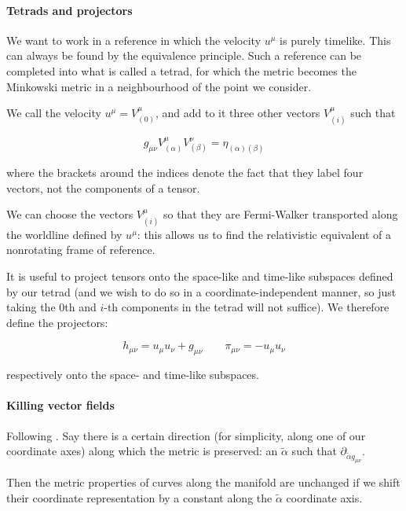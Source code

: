 \documentclass[main.tex]{subfiles}
\begin{document}
\paragraph{Tetrads and projectors} \label{par:tetrads}

We want to work in a reference in which the velocity $u^\mu$ is purely timelike. This can always be found by the equivalence principle. Such a reference can be completed into what  is called a tetrad, for which the metric becomes the Minkowski metric in a neighbourhood of the point we consider.

We call the velocity \(u^\mu = V^\mu _{(0)}\), and add to it three other vectors \(V^\mu_{(i)}\) such that

\begin{equation}
    g_{\mu\nu} V^\mu _{(\alpha)} V^\nu _{(\beta)} = \eta_{(\alpha) (\beta)}
\end{equation}

where the brackets around the indices denote the fact that they label four vectors, not the components of a tensor.

We can choose the vectors \(V_{(i)}^\mu\) so that they are Fermi-Walker transported along the worldline defined by \(u^\mu\): this allows us to find the relativistic equivalent of a nonrotating frame of reference.

It is useful to project tensors onto the space-like and time-like subspaces defined by our tetrad (and we wish to do so in a coordinate-independent manner,  so just taking the 0th and $i $-th components in the tetrad will not suffice). We therefore define the projectors:

\begin{equation}
    h_{\mu \nu} = u_\mu u_\nu + g_{\mu \nu} \qquad \pi_{\mu\nu} = -u_\mu u_\nu
\end{equation}

respectively onto the space- and time-like subspaces.

\paragraph{Killing vector fields}

Following \cite[section 25.2, page 650]{MisnerThorneWheeler:1973}.
Say there is a certain direction (for simplicity, along one of our coordinate axes) along which the metric is preserved: an \(\widetilde{\alpha}\) such that \(\partial_{\widetilde{\alpha} g_{\mu\nu}}\).

Then the metric properties of curves along the manifold are unchanged if we shift their coordinate representation by a constant along the \(\widetilde{\alpha}\) coordinate axis.
\end{document}
